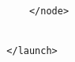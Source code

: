 \begin{center}
\begin{footnotesize}
\begin{verbatim}
      </node>


  </launch>


\end{verbatim}
\end{footnotesize}
\end{center}